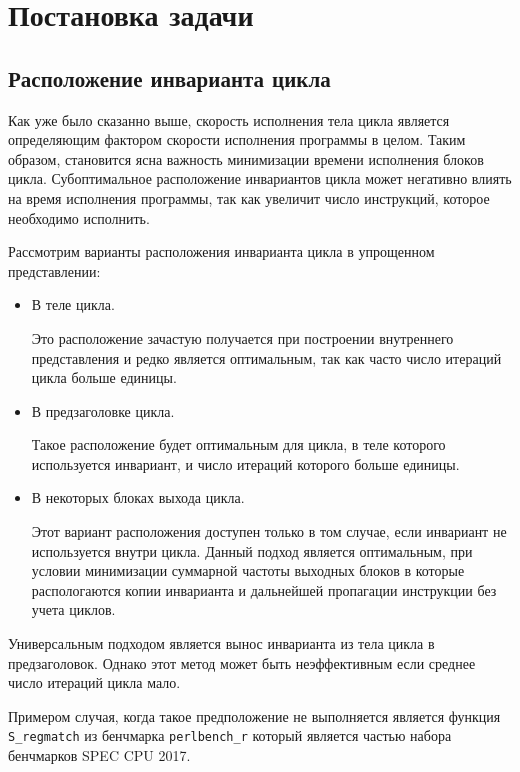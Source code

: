 \chapter{Постановка задачи}
\label{sec:Chapter1} 

\section{Расположение инварианта цикла}

Как уже было сказанно выше, скорость исполнения тела цикла является определяющим фактором скорости исполнения программы в целом.
Таким образом, становится ясна важность минимизации времени исполнения блоков цикла.
Субоптимальное расположение инвариантов цикла может негативно влиять на время исполнения программы, так как увеличит число инструкций, которое необходимо исполнить.

Рассмотрим варианты расположения инварианта цикла в упрощенном представлении:
\begin{itemize}
    \item В теле цикла.

        Это расположение зачастую получается при построении внутреннего представления и редко является оптимальным, так как часто число итераций цикла больше единицы.

    \item В предзаголовке цикла.

        Такое расположение будет оптимальным для цикла, в теле которого используется инвариант, и число итераций которого больше единицы.

    \item В некоторых блоках выхода цикла.

        Этот вариант расположения доступен только в том случае, если инвариант не используется внутри цикла.
        Данный подход является оптимальным, при условии минимизации суммарной частоты выходных блоков в которые распологаются копии инварианта и дальнейшей пропагации инструкции без учета циклов.
\end{itemize}

Универсальным подходом является вынос инварианта из тела цикла в предзаголовок.
Однако этот метод может быть неэффективным если среднее число итераций цикла мало.

Примером случая, когда такое предположение не выполняется является функция \texttt{S\_regmatch} из бенчмарка \texttt{perlbench\_r} который является частью набора бенчмарков SPEC CPU\textsuperscript{\tiny\textregistered} 2017.

